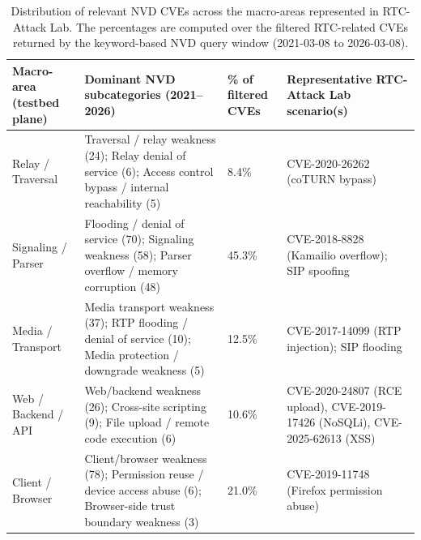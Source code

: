 \begin{table}[h!]
\centering
\scriptsize
\begin{tabular}{p{2.5cm}p{4.0cm}p{1.6cm}p{3.4cm}}
\toprule
\textbf{Macro-area (testbed plane)} & \textbf{Dominant NVD subcategories (2021--2026)} & \textbf{\% of filtered CVEs} & \textbf{Representative RTC-Attack Lab scenario(s)} \\
\midrule
Relay / Traversal & Traversal / relay weakness (24); Relay denial of service (6); Access control bypass / internal reachability (5) & 8.4\% & CVE-2020-26262 (coTURN bypass) \\
Signaling / Parser & Flooding / denial of service (70); Signaling weakness (58); Parser overflow / memory corruption (48) & 45.3\% & CVE-2018-8828 (Kamailio overflow); SIP spoofing \\
Media / Transport & Media transport weakness (37); RTP flooding / denial of service (10); Media protection / downgrade weakness (5) & 12.5\% & CVE-2017-14099 (RTP injection); SIP flooding \\
Web / Backend / API & Web/backend weakness (26); Cross-site scripting (9); File upload / remote code execution (6) & 10.6\% & CVE-2020-24807 (RCE upload), CVE-2019-17426 (NoSQLi), CVE-2025-62613 (XSS) \\
Client / Browser & Client/browser weakness (78); Permission reuse / device access abuse (6); Browser-side trust boundary weakness (3) & 21.0\% & CVE-2019-11748 (Firefox permission abuse) \\
\bottomrule
\end{tabular}
\caption{Distribution of relevant NVD CVEs across the macro-areas represented in RTC-Attack Lab. The percentages are computed over the filtered RTC-related CVEs returned by the keyword-based NVD query window (2021-03-08 to 2026-03-08).}\label{tab:nvd-macro-area-coverage}
\end{table}
